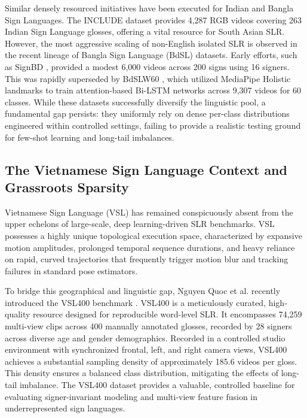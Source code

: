 \documentclass{ieeeaccess}
\begin{document}
Similar densely resourced initiatives have been executed for Indian and Bangla Sign Languages. The INCLUDE dataset \cite{sridhar2020include} provides 4,287 RGB videos covering 263 Indian Sign Language glosses, offering a vital resource for South Asian SLR. However, the most aggressive scaling of non-English isolated SLR is observed in the recent lineage of Bangla Sign Language (BdSL) datasets. Early efforts, such as SignBD \cite{sams2023signbd}, provided a modest 6,000 videos across 200 signs using 16 signers. This was rapidly superseded by BdSLW60 \cite{rubaiyeat2025bdslw60}, which utilized MediaPipe Holistic landmarks to train attention-based Bi-LSTM networks across 9,307 videos for 60 classes. While these datasets successfully diversify the linguistic pool, a fundamental gap persists: they uniformly rely on dense per-class distributions engineered within controlled settings, failing to provide a realistic testing ground for few-shot learning and long-tail imbalances.

\subsection{The Vietnamese Sign Language Context and Grassroots Sparsity}
Vietnamese Sign Language (VSL) has remained conspicuously absent from the upper echelons of large-scale, deep learning-driven SLR benchmarks. VSL possesses a highly unique topological execution space, characterized by expansive motion amplitudes, prolonged temporal sequence durations, and heavy reliance on rapid, curved trajectories that frequently trigger motion blur and tracking failures in standard pose estimators.

To bridge this geographical and linguistic gap, Nguyen Quoc et al. recently introduced the VSL400 benchmark \cite{nguyen2026vsl400}. VSL400 is a meticulously curated, high-quality resource designed for reproducible word-level SLR. It encompasses 74,259 multi-view clips across 400 manually annotated glosses, recorded by 28 signers across diverse age and gender demographics. Recorded in a controlled studio environment with synchronized frontal, left, and right camera views, VSL400 achieves a substantial sampling density of approximately 185.6 videos per gloss. This density ensures a balanced class distribution, mitigating the effects of long-tail imbalance. The VSL400 dataset provides a valuable, controlled baseline for evaluating signer-invariant modeling and multi-view feature fusion in underrepresented sign languages.
\end{document}
